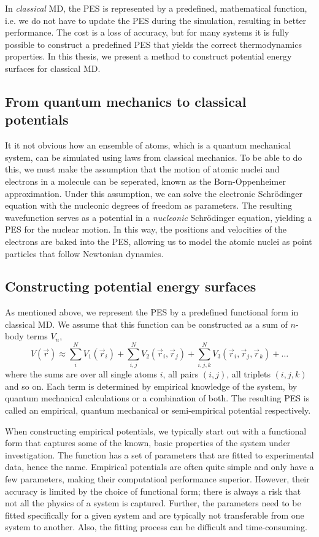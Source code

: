 \documentclass[twoside,english]{uiofysmaster}
\begin{document}
In \textit{classical} MD, the PES is represented by a predefined, mathematical function, i.e. we do not have to 
update the PES during the simulation, resulting in better performance. The cost is a loss of accuracy, but for many 
systems it is fully possible to construct a predefined PES that yields the correct thermodynamics properties. 
In this thesis, we present a method to construct potential energy surfaces for classical MD.  

\subsection{From quantum mechanics to classical potentials} \label{sec:bornOppenheimer}
It it not obvious how an ensemble of atoms, which is a quantum mechanical system, can be simulated using 
laws from classical mechanics. To be able to do this,
we must make the assumption that the motion of atomic nuclei and electrons in a molecule
can be seperated, known as the Born-Oppenheimer approximation. 
Under this assumption, we can solve the electronic Schr\"{o}dinger equation with the nucleonic degrees of freedom as parameters.
The resulting wavefunction serves as a potential in a \textit{nucleonic} Schr\"{o}dinger equation, yielding a PES 
for the nuclear motion. In this way, the positions and velocities of the electrons are baked into the PES, 
allowing us to model the atomic nuclei as point particles that follow Newtonian dynamics. 


\subsection{Constructing potential energy surfaces} \label{sec:constructingPES}
As mentioned above, we represent the PES by a predefined functional form in classical MD. We assume that this
function can be constructed as a sum of $n$-body terms $V_n$,
\begin{equation}
 V(\vec{r}) \approx \sum_i^N V_1(\vec{r}_i) + \sum_{i,j}^N V_2(\vec{r}_i, \vec{r}_j) + 
 \sum_{i,j,k}^N V_3(\vec{r}_i, \vec{r}_j, \vec{r}_k) + \dots
 \label{generalPotential}
\end{equation}
where the sums are over all single atoms $i$, all pairs $(i,j)$, all triplets $(i,j,k)$ and so on. 
Each term is determined by empirical knowledge of the system, by quantum mechanical calculations or a combination of both. 
The resulting PES is called an empirical, quantum mechanical or semi-empirical potential respectively. 

When constructing empirical potentials, we typically start out with a functional form that captures some of the known, basic properties
of the system under investigation. The function has a set of parameters that are fitted to experimental data, hence the name.
Empirical potentials are often quite simple and only have a few parameters, making their computatioal performance superior. 
However, their
accuracy is limited by the choice of functional form; there is always a risk that not all the physics of a system
is captured. Further, the parameters need to be fitted specifically for a given system and are typically not transferable 
from one system to another. Also, the fitting process can be difficult and time-consuming. 
\end{document}
